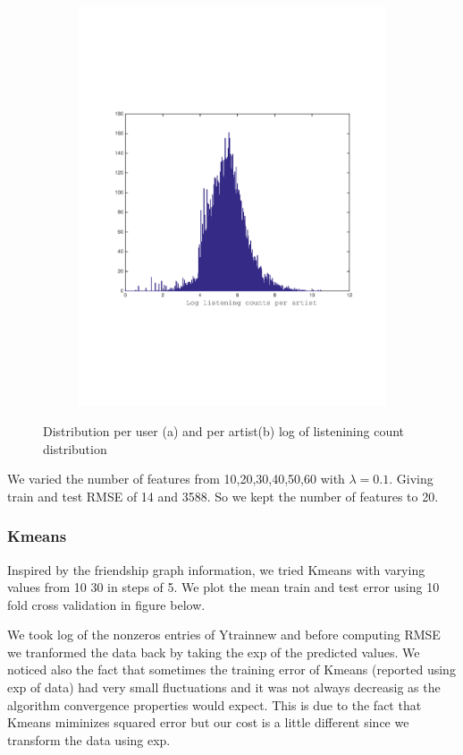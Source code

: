 \begin{figure}[h]
\begin{subfigure}[b]{0.45\textwidth}
    \includegraphics[width=\textwidth]{figures/histCountPerArtist.pdf}
    \caption{}
  \end{subfigure}
  \caption{Distribution per user (a) and per artist(b) log of listenining count distribution}
  \label{fig:new_plot}
\end{figure}

We varied the number of features from 10,20,30,40,50,60 with $\lambda = 0.1$. Giving train and test RMSE of 14 and 3588. So we kept the number of features to 20.
\subsubsection{Kmeans}
Inspired by the friendship graph information, we tried Kmeans with
varying values from 10 30 in steps of 5. We plot the mean train and test error using 10 fold cross validation in figure below.

We took log of the nonzeros entries of Ytrainnew and before 
computing RMSE we tranformed the data back by taking the exp
of the predicted values.
We noticed also the fact that sometimes the training error of Kmeans
(reported using exp of data) had very small fluctuations and it was not always decreasig as the algorithm convergence properties would expect. This is due to the fact that Kmeans miminizes squared error but our cost is a little different since we transform the data using exp.

